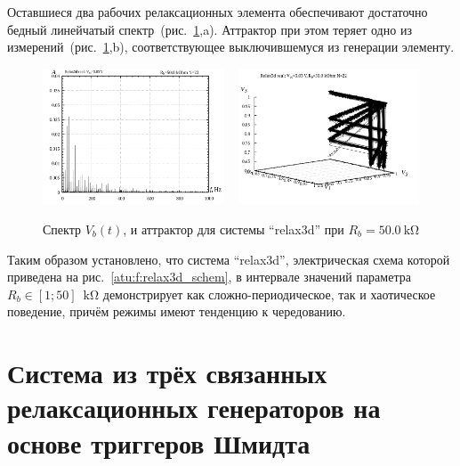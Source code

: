 Оставшиеся два рабочих релаксационных элемента обеспечивают
достаточно бедный линейчатый спектр~(рис.~\ref{atu:f:relax3d_f_22},a).
Аттрактор при этом теряет одно из измерений~(рис.~\ref{atu:f:relax3d_f_22},b),
соответствующее выключившемуся из генерации элементу.

\begin{figure}[htb!]
  \centerline{
    \includegraphics[width=0.48\textwidth]{p/relax3d_f_22.png}
    ~
    \includegraphics[width=0.48\textwidth]{p/relax3d_v1v2v3_22.png}
  }
  \caption{Спектр $V_b(t)$, и аттрактор для системы ``relax3d'' при $R_b=\SI{50.0}{\kilo\ohm}$ }
  \label{atu:f:relax3d_f_22}
\end{figure}

Таким образом установлено, что
система ``relax3d'', электрическая схема которой приведена на рис.~\ref{atu:f:relax3d_schem},
в интервале значений параметра $R_b \in [1;50]\;\SI{}{\kilo\ohm}$
демонстрирует как сложно-периодическое, так и хаотическое поведение,
причём режимы имеют тенденцию к чередованию.

\section{Система из трёх связанных релаксационных генераторов на основе триггеров Шмидта}
\label{atu:sec:relax3ds}

